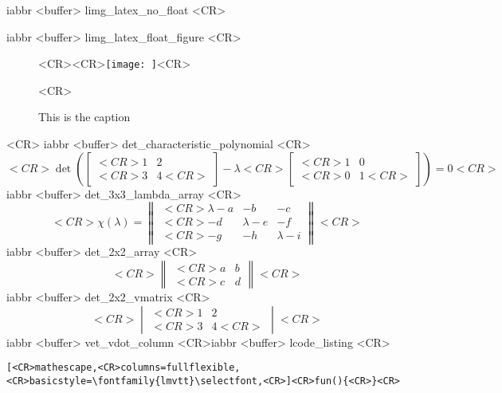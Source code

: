 iabbr <buffer> limg_latex_no_float <CR>\begin{minipage}{\linewidth}%
iabbr <buffer> limg_latex_float_figure <CR>\begin{figure}<CR>\centering<CR>\texttt{[image:  ]}<CR>\caption{This is the caption}<CR>\end{figure}<CR>%
iabbr <buffer> det_characteristic_polynomial <CR>\[<CR>\det\left(\begin{bmatrix}<CR>1 & 2\\<CR>3 & 4<CR>\end{bmatrix} - \lambda<CR>\begin{bmatrix}<CR>1 & 0\\<CR>0 & 1<CR>\end{bmatrix} \right)  = 0<CR>\]
iabbr <buffer> det_3x3_lambda_array <CR>\[<CR>\chi(\lambda) = \left\| \begin{array}{ccc}<CR>\lambda - a & -b & -c \\<CR>-d & \lambda - e & -f \\<CR>-g & -h & \lambda - i \end{array} \right\|<CR>\]
iabbr <buffer> det_2x2_array <CR>\[<CR>\left\| \begin{array}{cc}<CR>a & b \\<CR>c & d \end{array} \right\|<CR>\]
iabbr <buffer> det_2x2_vmatrix <CR>\[<CR>\begin{vmatrix}<CR>1 & 2\\<CR>3 & 4<CR>\end{vmatrix}<CR>\]
iabbr <buffer> vet_vdot_column <CR>
iabbr <buffer> lcode_listing <CR>\begin{lstlisting}[<CR>mathescape,<CR>columns=fullflexible,<CR>basicstyle=\fontfamily{lmvtt}\selectfont,<CR>]<CR>fun(){<CR>}<CR>\end{lstlisting}

\end{minipage}
